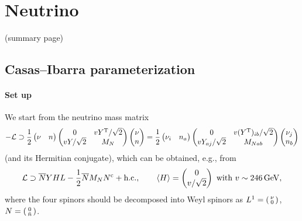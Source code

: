 \documentclass[CheatSheet]{subfiles}
\begin{document}
\summarystyle
\section{Neutrino}

(summary page)

\clearpage
\detailstyle

\subsection{Casas--Ibarra parameterization}
\paragraph{Set up}
We start from the neutrino mass matrix
\begin{equation}
-\mathcal L\supset \frac12
 \begin{pmatrix}\nu & n\end{pmatrix} \begin{pmatrix}0 & v Y^{\mathrm{T}}/\sqrt2 \\ v Y/\sqrt2 & M_N\end{pmatrix} \begin{pmatrix}\nu \\ n\end{pmatrix}
= \frac12\begin{pmatrix}\nu_i & n_a\end{pmatrix} \begin{pmatrix}0 & v (Y^{\mathrm{T}})_{ib}/\sqrt2 \\ v Y_{aj}/\sqrt2 & M_{Nab}\end{pmatrix} \begin{pmatrix}\nu_j \\ n_b\end{pmatrix}
\end{equation}
(and its Hermitian conjugate), which can be obtained, e.g., from
\begin{equation}
 \mathcal L \supset \overline{N}Y H L - \frac12\overline{N}M_N N^{\mathrm{c}} + \text{h.c.},
\qquad
\langle H\rangle=\begin{pmatrix}0\\v/\sqrt2\end{pmatrix}\text{~with~}v\sim246\,\mathrm{GeV},
\end{equation}
where the four spinors should be decomposed into Weyl spinors as
$L^1=\left(\begin{smallmatrix}\nu\\0\end{smallmatrix}\right)$,
$N=\left(\begin{smallmatrix}0\\\bar n\end{smallmatrix}\right)$.
\end{document}
